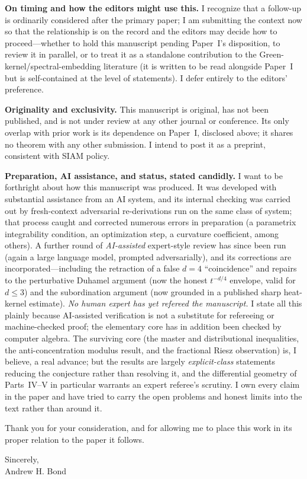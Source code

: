 \documentclass[11pt]{article}
\begin{document}
\textbf{On timing and how the editors might use this.} I recognize that a follow-up is
ordinarily considered after the primary paper; I am submitting the context now so that the
relationship is on the record and the editors may decide how to proceed---whether to hold
this manuscript pending Paper~I's disposition, to review it in parallel, or to treat it as a
standalone contribution to the Green-kernel/spectral-embedding literature (it is written to be
read alongside Paper~I but is self-contained at the level of statements). I defer entirely to
the editors' preference.

\textbf{Originality and exclusivity.} This manuscript is original, has not been published, and
is not under review at any other journal or conference. Its only overlap with prior work is
its dependence on Paper~I, disclosed above; it shares no theorem with any other submission. I
intend to post it as a preprint, consistent with SIAM policy.

\textbf{Preparation, AI assistance, and status, stated candidly.} I want to be forthright
about how this manuscript was produced. It was developed with substantial assistance from an
AI system, and its internal checking was carried out by fresh-context adversarial
re-derivations run on the same class of system; that process caught and corrected numerous
errors in preparation (a parametrix integrability condition, an optimization step, a curvature
coefficient, among others). A further round of \emph{AI-assisted} expert-style
review has since been run (again a large language model, prompted adversarially), and its
corrections are incorporated---including the retraction of a false $d=4$ ``coincidence'' and
repairs to the perturbative Duhamel argument (now the honest $t^{-d/4}$ envelope, valid for
$d\le3$) and the subordination argument (now grounded in a published sharp heat-kernel
estimate). \emph{No human expert has yet refereed the manuscript.} I state all this plainly
because AI-assisted verification is not a substitute for refereeing or machine-checked proof;
the elementary core has in addition been checked by computer algebra. The surviving core (the master and
distributional inequalities, the anti-concentration modulus result, and the fractional Riesz
observation) is, I believe, a real advance; but the results are largely \emph{explicit-class}
statements reducing the conjecture rather than resolving it, and the differential geometry of
Parts~IV--V in particular warrants an expert referee's scrutiny. I own every claim in the
paper and have tried to carry the open problems and honest limits into the text rather than
around it.

Thank you for your consideration, and for allowing me to place this work in its proper
relation to the paper it follows.

\bigskip
Sincerely,\\
Andrew H. Bond
\end{document}

